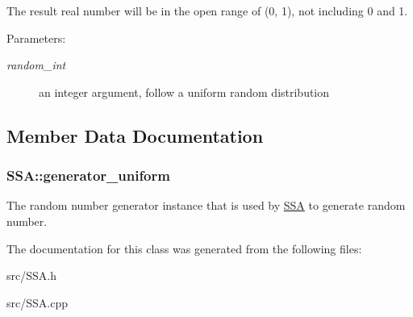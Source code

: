 The result real number will be in the open range of (0, 1), not including 0 and 1. \begin{Desc}
\item[Parameters:]
\begin{description}
\item[{\em random\_\-int}]an integer argument, follow a uniform random distribution \end{description}
\end{Desc}


\subsection{Member Data Documentation}
\hypertarget{class_s_s_a_744b27ebbc7e43d58ac2a980891442db}{
\subsubsection{ {\bf SSA::generator\_\-uniform}}}
\label{class_s_s_a_744b27ebbc7e43d58ac2a980891442db}


The random number generator instance that is used by \hyperlink{class_s_s_a}{SSA} to generate random number. 

The documentation for this class was generated from the following files:\begin{CompactItemize}
\item 
src/SSA.h\item 
src/SSA.cpp\end{CompactItemize}
